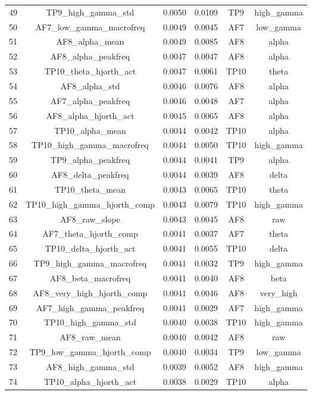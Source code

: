 \begin{table}[hptb]
\begin{table}
\begin{tabular}{cccccc}
49 & TP9_high_gamma_std & 0.0050 & 0.0109 & TP9 & high_gamma \\
50 & AF7_low_gamma_macrofreq & 0.0049 & 0.0045 & AF7 & low_gamma \\
51 & AF8_alpha_mean & 0.0049 & 0.0085 & AF8 & alpha \\
52 & AF8_alpha_peakfreq & 0.0047 & 0.0047 & AF8 & alpha \\
53 & TP10_theta_hjorth_act & 0.0047 & 0.0061 & TP10 & theta \\
54 & AF8_alpha_std & 0.0046 & 0.0076 & AF8 & alpha \\
55 & AF7_alpha_peakfreq & 0.0046 & 0.0048 & AF7 & alpha \\
56 & AF8_alpha_hjorth_act & 0.0045 & 0.0065 & AF8 & alpha \\
57 & TP10_alpha_mean & 0.0044 & 0.0042 & TP10 & alpha \\
58 & TP10_high_gamma_macrofreq & 0.0044 & 0.0050 & TP10 & high_gamma \\
59 & TP9_alpha_peakfreq & 0.0044 & 0.0041 & TP9 & alpha \\
60 & AF8_delta_peakfreq & 0.0044 & 0.0039 & AF8 & delta \\
61 & TP10_theta_mean & 0.0043 & 0.0065 & TP10 & theta \\
62 & TP10_high_gamma_hjorth_comp & 0.0043 & 0.0079 & TP10 & high_gamma \\
63 & AF8_raw_slope & 0.0043 & 0.0045 & AF8 & raw \\
64 & AF7_theta_hjorth_comp & 0.0041 & 0.0037 & AF7 & theta \\
65 & TP10_delta_hjorth_act & 0.0041 & 0.0055 & TP10 & delta \\
66 & TP9_high_gamma_macrofreq & 0.0041 & 0.0032 & TP9 & high_gamma \\
67 & AF8_beta_macrofreq & 0.0041 & 0.0040 & AF8 & beta \\
68 & AF8_very_high_hjorth_comp & 0.0041 & 0.0046 & AF8 & very_high \\
69 & AF7_high_gamma_peakfreq & 0.0041 & 0.0029 & AF7 & high_gamma \\
70 & TP10_high_gamma_std & 0.0040 & 0.0038 & TP10 & high_gamma \\
71 & AF8_raw_mean & 0.0040 & 0.0042 & AF8 & raw \\
72 & TP9_low_gamma_hjorth_comp & 0.0040 & 0.0034 & TP9 & low_gamma \\
73 & AF8_high_gamma_std & 0.0039 & 0.0052 & AF8 & high_gamma \\
74 & TP10_alpha_hjorth_act & 0.0038 & 0.0029 & TP10 & alpha \\

\end{tabular}
\end{table}
\end{table}
